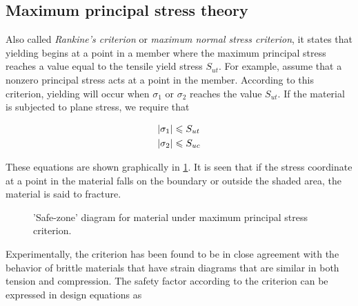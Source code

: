 \documentclass[a4paper,openany,12pt]{book}
\begin{document}
\subsection{Maximum principal stress theory}
\label{maximum-principal-stress-theory}
Also called \emph{Rankine's criterion} or \emph{maximum normal stress criterion},
it states that yielding begins at a point in a member where the maximum
principal stress reaches a value equal to the tensile yield stress
\(S_{ut}\). For example, assume that a nonzero principal stress acts at a
point in the member. According to this criterion, yielding will occur
when \(\sigma_1\) or \(\sigma_2\) reaches the value \(S_{ut}\). If the
material is subjected to plane stress, we require that

$$\begin{gathered}
    \left| \sigma _1 \right| \leqslant S_{ut} \hfill \\
    \left| \sigma _2 \right| \leqslant S_{uc} \hfill \\ 
  \end{gathered}$$

These equations are shown graphically in
\ref{fig: MNST safe zone}. It is seen that if the
stress coordinate at a point in the material falls on the boundary or
outside the shaded area, the material is said to fracture.

\begin{figure}[h]
  \centering
  \caption{'Safe-zone' diagram for material under maximum principal stress criterion.}
  \label{fig: MNST safe zone}
\end{figure}

Experimentally, the criterion has been found to be in close agreement
with the behavior of brittle materials that have strain diagrams that
are similar in both tension and compression. The safety factor according
to the criterion can be expressed in design equations as
\end{document}
